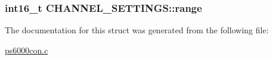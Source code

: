 \subsubsection[{\texorpdfstring{range}{range}}]{\setlength{\rightskip}{0pt plus 5cm}int16\+\_\+t C\+H\+A\+N\+N\+E\+L\+\_\+\+S\+E\+T\+T\+I\+N\+G\+S\+::range}\hypertarget{structCHANNEL__SETTINGS_a52292e91349f85b64a30d069d19f8eab}{}\label{structCHANNEL__SETTINGS_a52292e91349f85b64a30d069d19f8eab}


The documentation for this struct was generated from the following file\+:\begin{DoxyCompactItemize}
\item 
\hyperlink{ps6000con_8c}{ps6000con.\+c}\end{DoxyCompactItemize}
